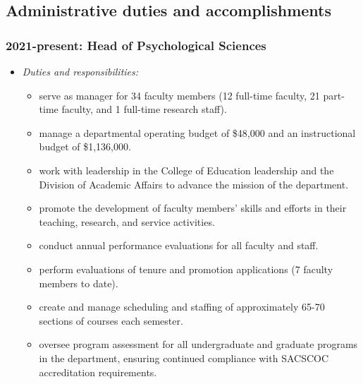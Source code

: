 \documentclass[article,10pt]{article}
\begin{document}
\subsection*{Administrative duties and accomplishments}
\label{sec:org18c33ba}
\subsubsection*{2021-present: Head of Psychological Sciences}
\label{sec:org25d1f72}
\begin{itemize}
\item \emph{Duties and responsibilities:}
\begin{itemize}
\item serve as manager for 34 faculty members (12 full-time faculty, 21 part-time faculty, and 1 full-time research staff).
\item manage a departmental operating budget of \$48,000 and an instructional budget of \$1,136,000.
\item work with leadership in the College of Education leadership and the Division of Academic Affairs to advance the mission of the department.
\item promote the development of faculty members' skills and efforts in their teaching, research, and service activities.
\item conduct annual performance evaluations for all faculty and staff.
\item perform evaluations of tenure and promotion applications (7 faculty members to date).
\item create and manage scheduling and staffing of approximately 65-70 sections of courses each semester.
\item oversee program assessment for all undergraduate and graduate programs in the department, ensuring continued compliance with SACSCOC accreditation requirements.
\end{itemize}


\end{itemize}
\end{document}
